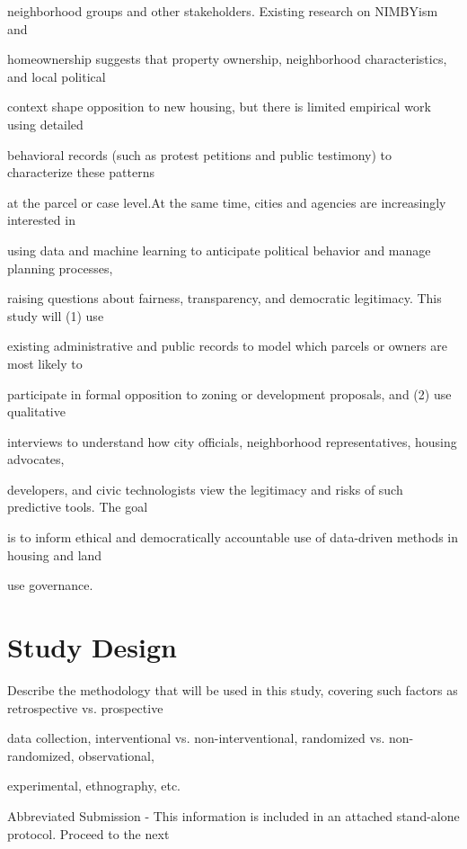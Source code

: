 \documentclass[10pt, letterpaper]{article}
\begin{document}
neighborhood groups and other stakeholders. Existing research on NIMBYism and

homeownership suggests that property ownership, neighborhood characteristics, and local political

context shape opposition to new housing, but there is limited empirical work using detailed

behavioral records (such as protest petitions and public testimony) to characterize these patterns

at the parcel or case level.At the same time, cities and agencies are increasingly interested in

using data and machine learning to anticipate political behavior and manage planning processes,

raising questions about fairness, transparency, and democratic legitimacy. This study will (1) use

existing administrative and public records to model which parcels or owners are most likely to

participate in formal opposition to zoning or development proposals, and (2) use qualitative

interviews to understand how city officials, neighborhood representatives, housing advocates,

developers, and civic technologists view the legitimacy and risks of such predictive tools. The goal

is to inform ethical and democratically accountable use of data-driven methods in housing and land

use governance.

\vspace{0.5em}

\section*{Study Design}

Describe the methodology that will be used in this study, covering such factors as retrospective vs. prospective

data collection, interventional vs. non-interventional, randomized vs. non-randomized, observational,

experimental, ethnography, etc.

\noindent \makebox[0pt][l]{$\square$}\hspace{1.2em} Abbreviated Submission - This information is included in an attached stand-alone protocol. Proceed to the next
\end{document}
